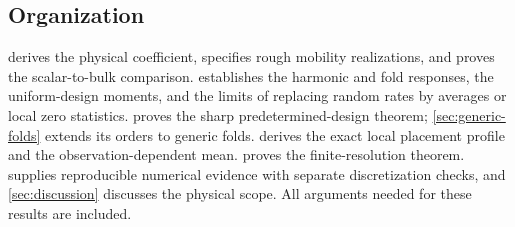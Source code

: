 \subsection{Organization}
 derives the physical coefficient, specifies rough
mobility realizations, and proves the scalar-to-bulk comparison.
 establishes the harmonic and fold responses,
the uniform-design moments, and the limits of replacing random rates
by averages or local zero statistics.  proves
the sharp predetermined-design theorem; \cref{sec:generic-folds}
extends its orders to generic folds. 
derives the exact local placement profile and the observation-dependent
mean.  proves the finite-resolution theorem.
 supplies reproducible numerical evidence with
separate discretization checks, and \cref{sec:discussion} discusses
the physical scope. All arguments needed for these results are included.
